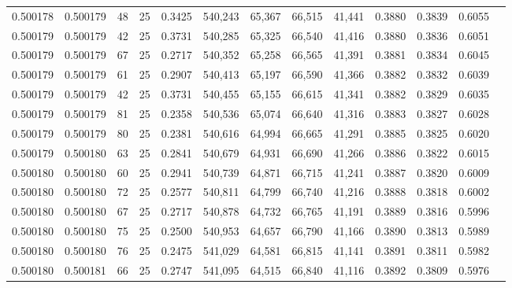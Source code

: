 \begin{tabular}{rrrrrrrrrrrrr}
0.500178 & 0.500179 &    48 &  25 &                                     0.3425 & 540,243 &  65,367 &  66,515 &  41,441 & 0.3880 & 0.3839 & 0.6055 \\
0.500179 & 0.500179 &    42 &  25 &                                     0.3731 & 540,285 &  65,325 &  66,540 &  41,416 & 0.3880 & 0.3836 & 0.6051 \\
0.500179 & 0.500179 &    67 &  25 &                                     0.2717 & 540,352 &  65,258 &  66,565 &  41,391 & 0.3881 & 0.3834 & 0.6045 \\
0.500179 & 0.500179 &    61 &  25 &                                     0.2907 & 540,413 &  65,197 &  66,590 &  41,366 & 0.3882 & 0.3832 & 0.6039 \\
0.500179 & 0.500179 &    42 &  25 &                                     0.3731 & 540,455 &  65,155 &  66,615 &  41,341 & 0.3882 & 0.3829 & 0.6035 \\
0.500179 & 0.500179 &    81 &  25 &                                     0.2358 & 540,536 &  65,074 &  66,640 &  41,316 & 0.3883 & 0.3827 & 0.6028 \\
0.500179 & 0.500179 &    80 &  25 &                                     0.2381 & 540,616 &  64,994 &  66,665 &  41,291 & 0.3885 & 0.3825 & 0.6020 \\
0.500179 & 0.500180 &    63 &  25 &                                     0.2841 & 540,679 &  64,931 &  66,690 &  41,266 & 0.3886 & 0.3822 & 0.6015 \\
0.500180 & 0.500180 &    60 &  25 &                                     0.2941 & 540,739 &  64,871 &  66,715 &  41,241 & 0.3887 & 0.3820 & 0.6009 \\
0.500180 & 0.500180 &    72 &  25 &                                     0.2577 & 540,811 &  64,799 &  66,740 &  41,216 & 0.3888 & 0.3818 & 0.6002 \\
0.500180 & 0.500180 &    67 &  25 &                                     0.2717 & 540,878 &  64,732 &  66,765 &  41,191 & 0.3889 & 0.3816 & 0.5996 \\
0.500180 & 0.500180 &    75 &  25 &                                     0.2500 & 540,953 &  64,657 &  66,790 &  41,166 & 0.3890 & 0.3813 & 0.5989 \\
0.500180 & 0.500180 &    76 &  25 &                                     0.2475 & 541,029 &  64,581 &  66,815 &  41,141 & 0.3891 & 0.3811 & 0.5982 \\
0.500180 & 0.500181 &    66 &  25 &                                     0.2747 & 541,095 &  64,515 &  66,840 &  41,116 & 0.3892 & 0.3809 & 0.5976 \\

\end{tabular}
